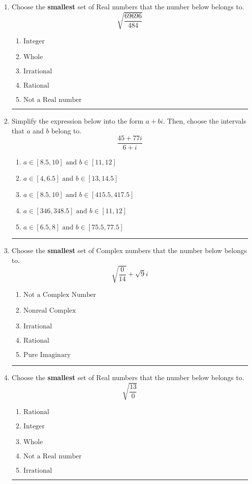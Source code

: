 \documentclass[14pt]{extbook}
\newcommand{\litem}[1]{\item#1\hspace*{-1cm}\rule{\textwidth}{0.4pt}}
\begin{document}
\begin{enumerate}
{\begin{enumerate}[label=\Alph*.]
\end{enumerate} }
\litem{
Choose the \textbf{smallest} set of Real numbers that the number below belongs to.\[ \sqrt{\frac{69696}{484}} \]\begin{enumerate}[label=\Alph*.]
\item \( \text{Integer} \)
\item \( \text{Whole} \)
\item \( \text{Irrational} \)
\item \( \text{Rational} \)
\item \( \text{Not a Real number} \)

\end{enumerate} }
\litem{
Simplify the expression below into the form $a+bi$. Then, choose the intervals that $a$ and $b$ belong to.\[ \frac{45 + 77 i}{6 + i} \]\begin{enumerate}[label=\Alph*.]
\item \( a \in [8.5, 10] \text{ and } b \in [11, 12] \)
\item \( a \in [4, 6.5] \text{ and } b \in [13, 14.5] \)
\item \( a \in [8.5, 10] \text{ and } b \in [415.5, 417.5] \)
\item \( a \in [346, 348.5] \text{ and } b \in [11, 12] \)
\item \( a \in [6.5, 8] \text{ and } b \in [75.5, 77.5] \)

\end{enumerate} }
\litem{
Choose the \textbf{smallest} set of Complex numbers that the number below belongs to.\[ \sqrt{\frac{0}{14}}+\sqrt{9}i \]\begin{enumerate}[label=\Alph*.]
\item \( \text{Not a Complex Number} \)
\item \( \text{Nonreal Complex} \)
\item \( \text{Irrational} \)
\item \( \text{Rational} \)
\item \( \text{Pure Imaginary} \)

\end{enumerate} }
\litem{
Choose the \textbf{smallest} set of Real numbers that the number below belongs to.\[ \sqrt{\frac{13}{0}} \]\begin{enumerate}[label=\Alph*.]
\item \( \text{Rational} \)
\item \( \text{Integer} \)
\item \( \text{Whole} \)
\item \( \text{Not a Real number} \)
\item \( \text{Irrational} \)


\end{enumerate}}
\end{enumerate}
\end{document}
